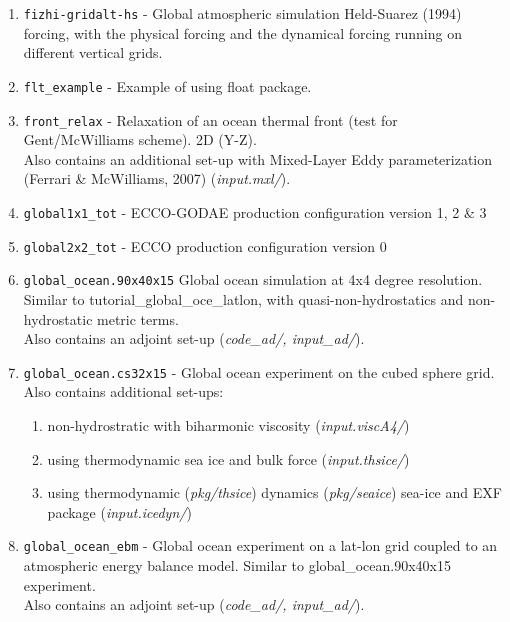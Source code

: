 \begin{enumerate}
\item \texttt{fizhi-gridalt-hs} - Global atmospheric simulation
  Held-Suarez (1994) forcing, with the physical forcing and the
  dynamical forcing running on different vertical grids.

\item \texttt{flt\_example} - Example of using float package.
  
\item \texttt{front\_relax} - Relaxation of an ocean thermal front
  (test for Gent/McWilliams scheme). 2D (Y-Z).\\
  Also contains an additional set-up with Mixed-Layer Eddy parameterization
  (Ferrari \& McWilliams, 2007) ({\it input.mxl/}).

\item \texttt{global1x1\_tot} - ECCO-GODAE production configuration
 version 1, 2 \& 3

\item \texttt{global2x2\_tot} - ECCO production configuration version 0

\item \texttt{global\_ocean.90x40x15} Global ocean simulation at 4x4 
  degree resolution. Similar to tutorial\_global\_oce\_latlon, with
  quasi-non-hydrostatics and non-hydrostatic metric terms.\\
  Also contains an adjoint set-up ({\it code\_ad/, input\_ad/}).

\item \texttt{global\_ocean.cs32x15} - Global ocean experiment on the
  cubed sphere grid.\\ 
  Also contains additional set-ups:
  \begin{enumerate}
   \item non-hydrostratic with biharmonic viscosity ({\it input.viscA4/})
   \item using thermodynamic sea ice and bulk force ({\it input.thsice/})
   \item using thermodynamic ({\it pkg/thsice}) dynamics ({\it pkg/seaice}) sea-ice
         and EXF package ({\it input.icedyn/})
  \end{enumerate}

\item \texttt{global\_ocean\_ebm} - Global ocean experiment on a lat-lon
  grid coupled to an atmospheric energy balance model. Similar to
  global\_ocean.90x40x15 experiment.\\
  Also contains an adjoint set-up ({\it code\_ad/, input\_ad/}).


\end{enumerate}
